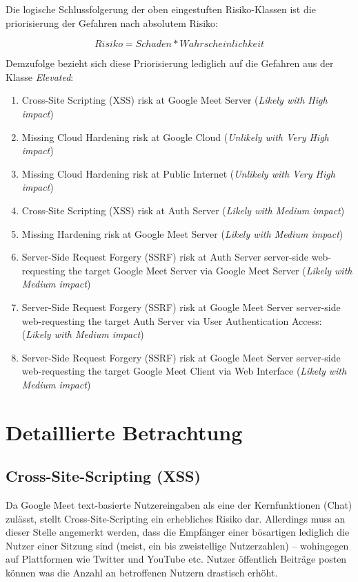 \documentclass{article}
\begin{document}
Die logische Schlussfolgerung der oben eingestuften Risiko-Klassen ist die priorisierung 
der Gefahren nach absolutem Risiko:

$$Risiko = Schaden * Wahrscheinlichkeit$$

\vspace{0.5em}

Demzufolge bezieht sich diese Priorisierung lediglich auf die Gefahren aus der Klasse 
\textit{Elevated}:

\begin{enumerate}
	\item Cross-Site Scripting (XSS) risk at Google Meet Server (\textit{Likely with High impact})
	\item Missing Cloud Hardening risk at Google Cloud (\textit{Unlikely with Very High impact})
	\item Missing Cloud Hardening risk at Public Internet (\textit{Unlikely with Very High impact})
	\item Cross-Site Scripting (XSS) risk at Auth Server (\textit{Likely with Medium impact})
	\item Missing Hardening risk at Google Meet Server (\textit{Likely with Medium impact})
	\item Server-Side Request Forgery (SSRF) risk at Auth Server server-side web-requesting the target Google Meet Server via Google Meet Server (\textit{Likely with Medium impact})
	\item Server-Side Request Forgery (SSRF) risk at Google Meet Server server-side web-requesting the target Auth Server via User Authentication Access: (\textit{Likely with Medium impact})
	\item Server-Side Request Forgery (SSRF) risk at Google Meet Server server-side web-requesting the target Google Meet Client via Web Interface (\textit{Likely with Medium impact})
\end{enumerate}

\section{Detaillierte Betrachtung}

\subsection{Cross-Site-Scripting (XSS)}

Da Google Meet text-basierte Nutzereingaben als eine der Kernfunktionen (Chat) zulässt, 
stellt Cross-Site-Scripting ein erhebliches Risiko dar. Allerdings muss an dieser Stelle
angemerkt werden, dass die Empfänger einer bösartigen lediglich die Nutzer einer Sitzung 
sind (meist, ein bis zweistellige Nutzerzahlen) – wohingegen auf Plattformen wie Twitter 
und YouTube etc. Nutzer öffentlich Beiträge posten können was die Anzahl an betroffenen 
Nutzern drastisch erhöht.
\end{document}
